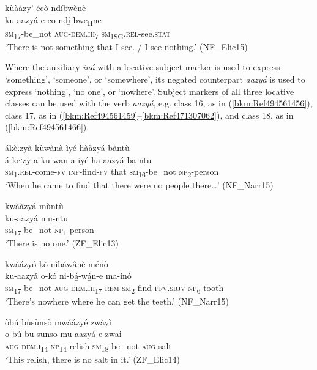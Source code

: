 \ea
\label{bkm:Ref99104890}
kùààzy’ écò ndíbwènè\\
\gll ku-aazyá  e-co    ndí̲-bwe\textsubscript{H}ne\\
\textsc{sm}\textsubscript{17}-be\_not  \textsc{aug}-\textsc{dem}.\textsc{iii}\textsubscript{7}  \textsc{sm}\textsubscript{1SG}.\textsc{rel}-see.\textsc{stat}\\
\glt ‘There is not something that I see. / I see nothing.’ (NF\_Elic15)
\z

Where the auxiliary \textit{iná} with a locative subject marker is used to express ‘something’, ‘someone’, or ‘somewhere’, its negated counterpart \textit{aazyá} is used to express ‘nothing’, ‘no one’, or ‘nowhere’. Subject markers of all three locative classes can be used with the verb \textit{aazyá}, e.g. class 16, as in (\ref{bkm:Ref494561456}), class 17, as in (\ref{bkm:Ref494561459}--\ref{bkm:Ref471307062}), and class 18, as in (\ref{bkm:Ref494561466}).

\ea
\label{bkm:Ref494561456}
ákèːzyà kùwànà ìyé hààzyá bàntù\\
\gll á̲-keːzy-a    ku-wan-a  iyé  ha-aazyá  ba-ntu\\
\textsc{sm}\textsubscript{1}.\textsc{rel}-come-\textsc{fv}  \textsc{inf}-find-\textsc{fv}  that  \textsc{sm}\textsubscript{16}-be\_not  \textsc{np}\textsubscript{2}-person\\
\glt ‘When he came to find that there were no people there…’ (NF\_Narr15)
\z

\ea
\label{bkm:Ref494561459}
kwààzyá mùntù\\
\gll ku-aazyá  mu-ntu\\
\textsc{sm}\textsubscript{17}-be\_not  \textsc{np}\textsubscript{1}-person\\
\glt ‘There is no one.’ (ZF\_Elic13)
\z

\ea
\label{bkm:Ref471307062}
kwàázyó kò nìbáwânè ménò\\
\gll ku-aazyá  o-kó      ni-bá̲-wá̲n-e      ma-inó\\
\textsc{sm}\textsubscript{17}-be\_not  \textsc{aug}-\textsc{dem}.\textsc{iii}\textsubscript{17}  \textsc{rem}-\textsc{sm}\textsubscript{2}-find-\textsc{pfv}.\textsc{sbjv}  \textsc{np}\textsubscript{6}-tooth\\
\glt ‘There’s nowhere where he can get the teeth.’ (NF\_Narr15)
\z

\ea
\label{bkm:Ref494561466}
òbú bùsùnsò mwáázyé zwàyì\\
\gll o-bú    bu-sunso  mu-aazyá  e-zwai\\
\textsc{aug}-\textsc{dem}.\textsc{i}\textsubscript{14}  \textsc{np}\textsubscript{14}-relish  \textsc{sm}\textsubscript{18}-be\_not  \textsc{aug}-salt\\
\glt ‘This relish, there is no salt in it.’ (ZF\_Elic14)
\z

